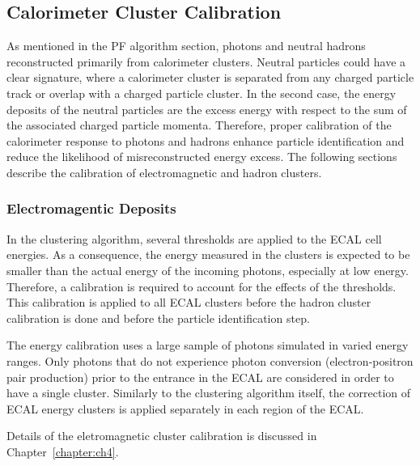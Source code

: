 \subsection{Calorimeter Cluster Calibration}
\label{subsec:calibration}
As mentioned in the PF algorithm section, photons and neutral hadrons reconstructed primarily from calorimeter clusters.
Neutral particles could have a clear signature, where a calorimeter cluster is separated from any charged particle track or overlap with a charged particle cluster.
In the second case, the energy deposits of the neutral particles are the excess energy with respect to the sum of the associated charged particle momenta. Therefore, proper calibration of the calorimeter response to photons and hadrons enhance particle identification and reduce the likelihood of misreconstructed energy excess.
The following sections describe the calibration of electromagnetic and hadron clusters.

\subsubsection{Electromagentic Deposits}

In the clustering algorithm, several thresholds are applied to the ECAL cell energies. %
As a consequence, the energy measured in the clusters is expected to be smaller than the actual energy of the incoming photons, especially at low energy.
Therefore, a calibration is required to account for the effects of the thresholds. %
This calibration is applied to all ECAL clusters before the hadron cluster calibration is done and before the particle identification step.

The energy calibration uses a large sample of photons simulated in varied energy ranges.
Only photons that do not experience photon conversion (electron-positron pair production) prior to the entrance in the ECAL are considered in order to have a single cluster.
Similarly to the clustering algorithm itself, the correction of ECAL energy clusters is applied separately in each region of the ECAL.

Details of the eletromagnetic cluster calibration is discussed in Chapter~\ref{chapter:ch4}.


